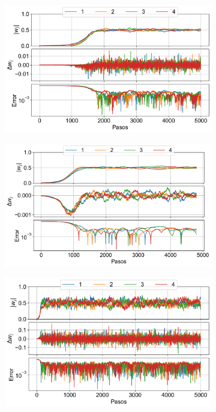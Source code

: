 \documentclass[aps,prb,twocolumn,superscriptaddress,floatfix,longbibliography]{revtex4-2}
\begin{document}
\begin{figure}
    \centering
    \begin{subfigure}[b]{0.45\textwidth}
        \centering
        \includegraphics[width=\textwidth]{ej1_fig1.png}
        \caption{\label{fig:ej1_fig1}}
    \end{subfigure}
    \hfill
    \begin{subfigure}[b]{0.45\textwidth}
        \centering
        \includegraphics[width=\textwidth]{ej1_fig2.png}
        \caption{\label{fig:ej1_fig2}}
    \end{subfigure}
    \hfill
    \begin{subfigure}[b]{0.45\textwidth}
        \centering
        \includegraphics[width=\textwidth]{ej1_fig3.png}

\end{subfigure}
\end{figure}
\end{document}
